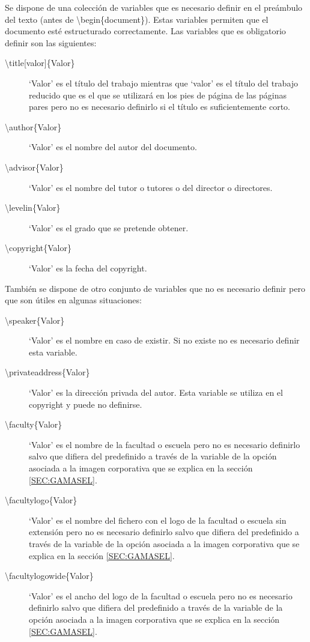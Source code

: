 Se dispone de una colección de variables que es necesario definir en el preámbulo del texto (antes de \textbackslash begin\{document\}). Estas variables permiten que el documento esté estructurado correctamente. Las variables que es obligatorio definir son las siguientes:
\begin{description}
  \item [\textbackslash {title[valor]}\{Valor\}] `Valor' es el título del trabajo mientras que `valor' es el título del trabajo reducido que es el que se utilizará en los pies de página de las páginas pares pero no es necesario definirlo si el título es suficientemente corto.
  \item [\textbackslash author\{Valor\}] `Valor' es el nombre del autor del documento.
  \item [\textbackslash advisor\{Valor\}] `Valor' es el nombre del tutor o tutores o del director o directores.
  \item [\textbackslash levelin\{Valor\}] `Valor' es el grado que se pretende obtener.
  \item [\textbackslash copyright\{Valor\}] `Valor' es la fecha del copyright.
\end{description}

También se dispone de otro conjunto de variables que no es necesario definir pero que son útiles en algunas situaciones:
\begin{description}
  \item [\textbackslash speaker\{Valor\}] `Valor' es el nombre en caso de existir. Si no existe no es necesario definir esta variable.
  \item [\textbackslash privateaddress\{Valor\}] `Valor' es la dirección privada del autor. Esta variable se utiliza en el copyright y puede no definirse.
  \item [\textbackslash faculty\{Valor\}] `Valor' es el nombre de la facultad o escuela pero no es necesario definirlo salvo que difiera del predefinido a través de la variable de la opción asociada a la imagen corporativa que se explica en la sección \ref{SEC:GAMASEL}.
  \item [\textbackslash facultylogo\{Valor\}] `Valor' es el nombre del fichero con el logo de la facultad o escuela sin extensión pero no es necesario definirlo salvo que difiera del predefinido a través de la variable de la opción asociada a la imagen corporativa que se explica en la sección \ref{SEC:GAMASEL}.
  \item [\textbackslash facultylogowide\{Valor\}] `Valor' es el ancho del logo de la facultad o escuela pero no es necesario definirlo salvo que difiera del predefinido a través de la variable de la opción asociada a la imagen corporativa que se explica en la sección \ref{SEC:GAMASEL}.
\end{description}

